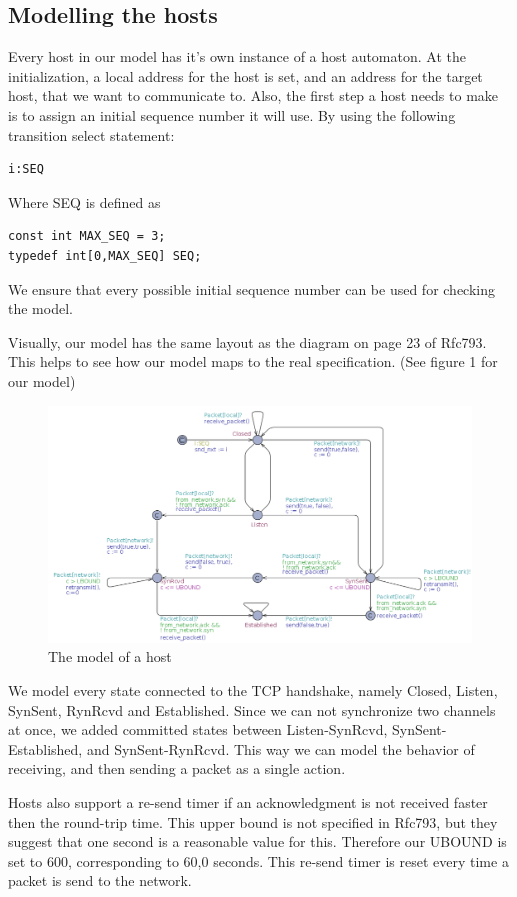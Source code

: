 \documentclass[twocolumn]{article}
\begin{document}
\subsection{Modelling the hosts}
Every host in our model has it's own instance of a host automaton. At the initialization, a local address for the host is set, and an address for the target host, that we want to communicate to. Also, the first step a host needs to make is to assign an initial sequence number it will use.
By using the following transition select statement:
\begin{verbatim}i:SEQ
\end{verbatim}
Where SEQ is defined as 
\begin{verbatim}const int MAX_SEQ = 3;
typedef int[0,MAX_SEQ] SEQ;
\end{verbatim}
We ensure that every possible initial sequence number can be used for checking the model.

Visually, our model has the same layout as the diagram on page 23 of Rfc793. This helps to see how our model maps to the real specification. (See figure 1 for our model)
\begin{figure}
  \includegraphics[width=\textwidth]{host_model}
  \caption{The model of a host}
\end{figure}
We model every state connected to the TCP handshake, namely Closed, Listen, SynSent, RynRcvd and Established. Since we can not synchronize two channels at once, we added committed states between Listen-SynRcvd, SynSent-Established, and SynSent-RynRcvd. This way we can model the behavior of receiving, and then sending a packet as a single action.

Hosts also support a re-send timer if an acknowledgment is not received faster then the round-trip time. This upper bound is not specified in Rfc793, but they suggest that one second is a reasonable value for this. Therefore our UBOUND is set to 600, corresponding to 60,0 seconds. This re-send timer is reset every time a packet is send to the network.
\end{document}
